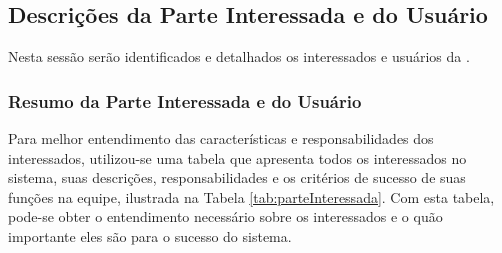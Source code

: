 
\subsection{Descrições da Parte Interessada e do Usuário}

Nesta sessão serão identificados e detalhados os interessados e usuários da \nomeferramenta{}.

\subsubsection{Resumo da Parte Interessada e do Usuário}

Para melhor entendimento das características e responsabilidades dos interessados, utilizou-se uma tabela que apresenta todos os interessados no sistema, suas descrições, responsabilidades e os critérios de sucesso de suas funções na equipe, ilustrada na Tabela \ref{tab:parteInteressada}. Com esta tabela, pode-se obter o entendimento necessário sobre os interessados e o quão importante eles são para o sucesso do sistema.

